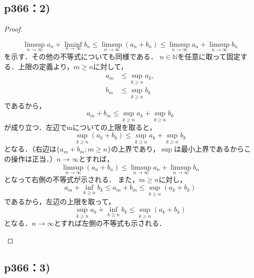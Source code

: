 \documentclass[uplatex,dvipdfmx,a4paper,10pt,fleqn]{jsarticle}
\begin{document}
  \subsection*{p366：2)}

  \begin{proof}
    \begin{leftbar}
      \[
        \limsup _{n \to \infty} a_n + \liminf _{n \to \infty} b_n \leq \limsup _{n \to \infty} (a_n + b_n) \leq \limsup _{n \to \infty} a_n + \limsup _{n \to \infty} b_n
      \]
      を示す．その他の不等式についても同様である．
      $n \in \mathbb{N}$を任意に取って固定する．上限の定義より，$m \geq n$に対して，
      \begin{align*}
        a_m &\leq \sup _{k \geq n} a_k, \\
        b_m &\leq \sup _{k \geq n} b_k
      \end{align*}
      であるから，
      \[
        a_m + b_m \leq \sup _{k \geq n} a_k + \sup _{k \geq n} b_k
      \]
      が成り立つ．左辺でmについての上限を取ると，
      \[
        \sup _{k \geq n} (a_k + b_k) \leq \sup _{k \geq n} a_k + \sup _{k \geq n} b_k
      \]
      となる．（右辺は$\{a_m + b_m; m \geq n\}$の上界であり，$\sup$は最小上界であるからこの操作は正当．）$n \to \infty$とすれば，
      \[
        \limsup _{n \to \infty} (a_n + b_n) \leq \limsup _{n \to \infty} a_n + \limsup _{n \to \infty} b_n
      \]
      となって右側の不等式が示される．
      また，$m \geq n$に対し，
      \[
        a_m + \inf _{k \geq n} b_k \leq a_m + b_m \leq \sup _{k \geq n} (a_k + b_k)
      \]
      であるから，左辺の上限を取って，
      \[
        \sup _{k \geq n} a_k + \inf _{k \geq n} b_k \leq \sup _{k \geq n} (a_k + b_k)
      \]
      となる．$n \to \infty$とすれば左側の不等式も示される．
    \end{leftbar}
  \end{proof}

\subsection*{p366：3)}
\end{document}
